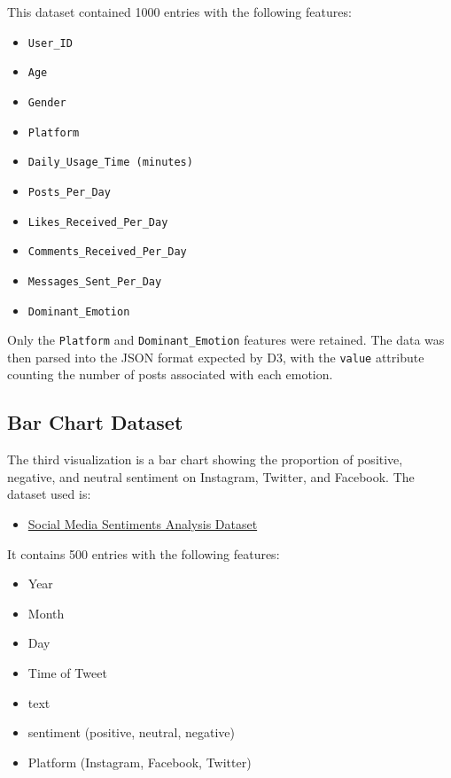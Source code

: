 \documentclass[a4paper,12pt,titlepage,leqno]{article}
\begin{document}
This dataset contained 1000 entries with the following features:

\begin{itemize}
\item \texttt{User\_ID}
\item \texttt{Age}
\item \texttt{Gender}
\item \texttt{Platform}
\item \texttt{Daily\_Usage\_Time (minutes)}
\item \texttt{Posts\_Per\_Day}
\item \texttt{Likes\_Received\_Per\_Day}
\item \texttt{Comments\_Received\_Per\_Day}
\item \texttt{Messages\_Sent\_Per\_Day}
\item \texttt{Dominant\_Emotion}
\end{itemize}

Only the \texttt{Platform} and \texttt{Dominant\_Emotion} features were retained. The data was then parsed into the JSON format expected by D3, with the \texttt{value} attribute counting the number of posts associated with each emotion.

\subsection{Bar Chart Dataset}

The third visualization is a bar chart showing the proportion of positive, negative, and neutral sentiment on Instagram, Twitter, and Facebook. The dataset used is:

\begin{itemize}
    \item \href{https://www.kaggle.com/datasets/kashishparmar02/social-media-sentiments-analysis-dataset}{Social Media Sentiments Analysis Dataset}
\end{itemize}

It contains 500 entries with the following features:
\begin{itemize}
    \item Year
    \item Month
    \item Day
    \item Time of Tweet
    \item text
    \item sentiment (positive, neutral, negative)
    \item Platform (Instagram, Facebook, Twitter)
\end{itemize}
\end{document}
